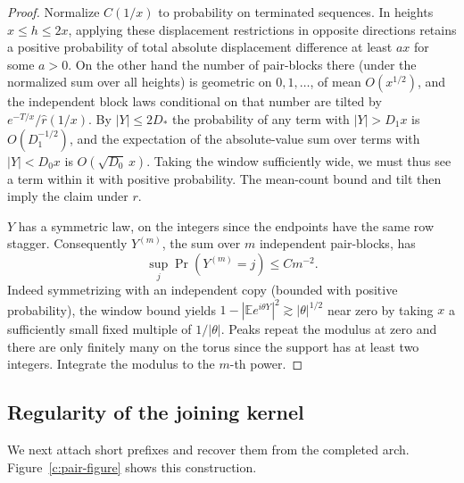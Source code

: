 \begin{proof}
Normalize \(C(1/x)\) to probability on terminated sequences. In heights \(x\le h\le 2x\), applying these displacement restrictions in opposite directions retains a positive probability of total absolute displacement difference at least \(a x\) for some \(a>0\). On the other hand the number of pair-blocks there (under the normalized sum over all heights) is geometric on \(0,1,\dots\), of mean \(O(x^{1/2})\), and the independent block laws conditional on that number are tilted by \(e^{-T/x}/\hat r(1/x)\). By \(|Y|\le2D_*\) the probability of any term with \(|Y|>D_1x\) is \(O(D_1^{-1/2})\), and the expectation of the absolute-value sum over terms with \(|Y|<D_0 x\) is \(O(\sqrt{D_0}\,x)\). Taking the window sufficiently wide, we must thus see a term within it with positive probability. The mean-count bound and tilt then imply the claim under \(r\).



\(Y\) has a symmetric law, on the integers since the endpoints have the same row stagger. Consequently \(Y^{(m)}\), the sum over \(m\) independent pair-blocks, has
\[
 \sup_j\Pr(Y^{(m)}=j)\le C m^{-2}.
\]
Indeed symmetrizing with an independent copy (bounded with positive probability), the window bound yields \(1-|\mathbb E e^{i\theta Y}|^2\gtrsim |\theta|^{1/2}\) near zero by taking \(x\) a sufficiently small fixed multiple of \(1/|\theta|\). Peaks repeat the modulus at zero and there are only finitely many on the torus since the support has at least two integers. Integrate the modulus to the \(m\)-th power.
\end{proof}

\subsection{Regularity of the joining kernel}
We next attach short prefixes and recover them from the completed arch.
Figure~\ref{c:pair-figure} shows this construction.

